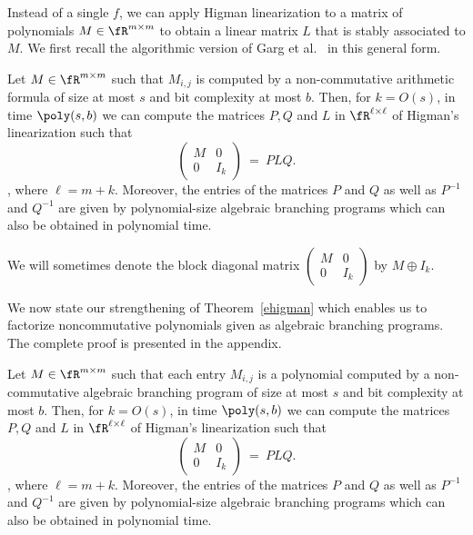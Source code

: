 Instead of a single $f$, we can apply Higman linearization to a matrix
of polynomials $M\in\fR^{m\times m}$ to obtain a linear matrix $L$
that is stably associated to $M$.  We first recall the algorithmic
version of Garg et al.~\cite{GGOW20} in this general form.

\begin{theorem}\label{ehigman}{\rm\cite[Proposition A.2]{GGOW20}}
Let $M \in \fR^{m \times m}$ such that $M_{i,j}$ is computed by a
non-commutative arithmetic formula of size at most $s$ and bit
complexity at most $b$. Then, for $k=O(s)$, in time $\poly(s,b)$ we
can compute the matrices $P, Q$ and $L$ in $\fR^{\ell \times \ell }$
of Higman's linearization such that
\[
\left(
\begin{array}{c|c}
M & 0 \\
\hline
0 & I_{k}
\end{array}
\right) ~=~PLQ.
\], where $\ell= m+k$.
Moreover, the entries of the matrices $P$ and $Q$ as well as $P^{-1}$
and $Q^{-1}$ are given by polynomial-size algebraic branching programs
which can also be obtained in polynomial time.
\end{theorem}

We will sometimes denote the block diagonal matrix
$\left(
\begin{array}{c|c}
M & 0 \\
\hline
0 & I_{k}
\end{array}
\right)$ by $M\oplus I_k$.

We now state our strengthening of Theorem~\ref{ehigman} which enables
us to factorize noncommutative polynomials given as algebraic
branching programs. The complete proof is presented in the appendix.

\begin{theorem}\label{block-higman}
  Let $M \in \fR^{m \times m}$ such that each entry $M_{i,j}$ is a
  polynomial computed by a non-commutative algebraic branching program
  of size at most $s$ and bit complexity at most $b$. Then, for
  $k=O(s)$, in time $\poly(s,b)$ we can compute the matrices $P, Q$
  and $L$ in $\fR^{\ell \times \ell }$ of Higman's linearization such
  that
\[
\left(
\begin{array}{c|c}
M & 0 \\
\hline
0 & I_{k}
\end{array}
\right) ~=~PLQ.
\], where $\ell= m+k$.
Moreover, the entries of the matrices $P$ and $Q$ as well as $P^{-1}$
and $Q^{-1}$ are given by polynomial-size algebraic branching programs
which can also be obtained in polynomial time.
\end{theorem}

